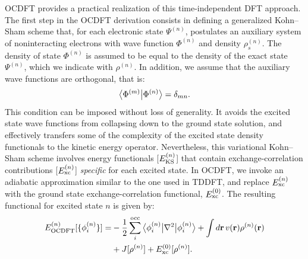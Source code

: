 \documentclass{article}
\begin{document}
OCDFT provides a practical realization of this time-independent DFT approach.
The first step in the OCDFT derivation consists in defining a generalized Kohn--Sham scheme that, for each electronic state $\Psi^{(n)}$,  postulates an auxiliary system of noninteracting electrons with wave function $\Phi^{(n)}$ and density $\rho_s^{(n)}$.  The density of state $\Phi^{(n)}$ is assumed to be equal to the density of the exact state $\Psi^{(n)}$, which we indicate with $\rho^{(n)}$.
In addition, we assume that the auxiliary wave functions are orthogonal, that is:
\begin{equation}\label{eq:orthogonality_condition}
\braket[1]{\Phi^{(m)}}{\Phi^{(n)}} = \delta_{mn}.
\end{equation}
This condition can be imposed without loss of generality.  It avoids the excited state wave functions from collapsing down to the ground state solution, and effectively transfers some of the complexity of the excited state density functionals to the kinetic energy operator.
Nevertheless, this variational Kohn--Sham scheme involves energy functionals [$E_{\rm KS}^{(n)}$] that contain exchange-correlation contributions [$E^{(n)}_{\rm xc}$] \textit{specific} for each excited state.
In OCDFT, we invoke an adiabatic approximation similar to the one used in TDDFT, and replace $E^{(n)}_{\rm xc}$ with the ground state exchange-correlation functional, $E^{(0)}_{\rm xc}$.
The resulting functional for excited state $n$ is given by:
\begin{equation}
\begin{split}\label{eq:OCDFTfunctional}
E^{(n)}_{\rm OCDFT}[\{\phi^{(n)}_i\}]=& -\frac{1}{2} \sum_i^{\rm occ} \bra[1]{\phi_i^{(n)}}\nabla^2\ket[1]{\phi_i^{(n)}} + 
\int d \mathbf{r} \, v(\mathbf{r}) \rho^{(n)}(\mathbf{r})\\
 &+ J[\rho^{(n)}] + E^{(0)}_{\rm xc}[\rho^{(n)}]. 
\end{split}
\end{equation}
\end{document}
